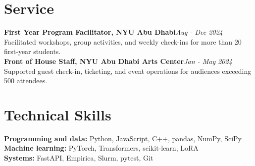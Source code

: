 \documentclass[a4paper,11pt]{article}
\newcommand{\entry}[2]{\textbf{#1}\hfill\textit{#2}}
\begin{document}
\section*{Service}
\entry{First Year Program Facilitator, NYU Abu Dhabi}{Aug - Dec 2024}\\
Facilitated workshops, group activities, and weekly check-ins for more than 20 first-year students.\\
\entry{Front of House Staff, NYU Abu Dhabi Arts Center}{Jan - May 2024}\\
Supported guest check-in, ticketing, and event operations for audiences exceeding 500 attendees.

\section*{Technical Skills}
\textbf{Programming and data:} Python, JavaScript, C++, pandas, NumPy, SciPy\\
\textbf{Machine learning:} PyTorch, Transformers, scikit-learn, LoRA\\
\textbf{Systems:} FastAPI, Empirica, Slurm, pytest, Git
\end{document}
